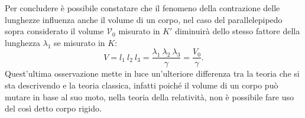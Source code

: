  Per concludere è possibile constatare che il fenomeno della contrazione delle lunghezze influenza anche il volume di un corpo, nel caso del parallelepipedo sopra considerato il volume $\mathcal{V}_0$ misurato in $K'$ diminuirà dello stesso fattore della lunghezza $\lambda_1$ se misurato in $K$:
 \begin{equation}
    V=l_1\ l_2\ l_3=\frac{\lambda_1\ \lambda_2\ \lambda_3}{\gamma}=\frac{V_0}{\gamma}.
    \label{contrazioneVolumi}
 \end{equation}
 Quest'ultima osservazione mette in luce un'ulteriore differenza tra la teoria che si sta descrivendo e la teoria classica, infatti poiché il volume di un corpo può mutare in base al suo moto, nella teoria della relatività, non è possibile fare uso del così detto corpo rigido.
